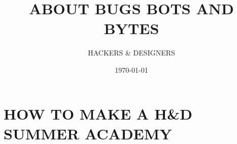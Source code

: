 \documentclass[11pt]{book}              %
\title{\bf ABOUT BUGS BOTS AND BYTES}    %
\author{HACKERS \& DESIGNERS}              %
\date{\today}                           %
\begin{document}
\frontmatter                            %
\maketitle                              %
\tableofcontents                        %
\mainmatter                             %
\part{HOW TO MAKE A H\&D SUMMER ACADEMY} %
\end{document}
